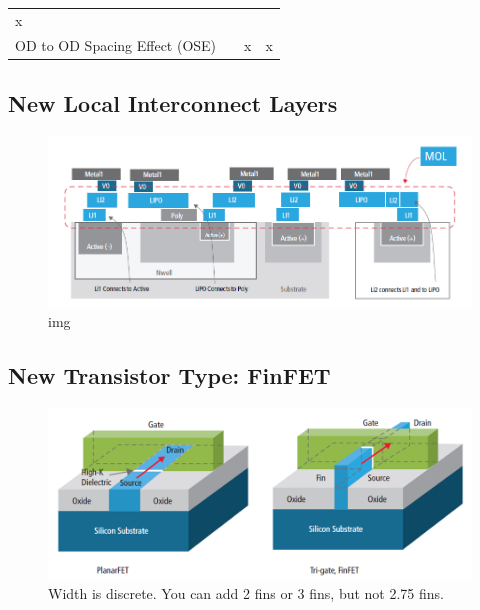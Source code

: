\documentclass[
]{article}
\begin{document}
\begin{longtable}[]{@{}lccc@{}}
\begin{minipage}[t]{0.14\columnwidth}
x\strut
\end{minipage}\tabularnewline
\begin{minipage}[t]{0.50\columnwidth}\raggedright
OD to OD Spacing Effect (OSE)\strut
\end{minipage} & \begin{minipage}[t]{0.12\columnwidth}\centering
\strut
\end{minipage} & \begin{minipage}[t]{0.12\columnwidth}\centering
x\strut
\end{minipage} & \begin{minipage}[t]{0.14\columnwidth}\centering
x\strut
\end{minipage}\tabularnewline
\bottomrule
\end{longtable}

\hypertarget{new-local-interconnect-layers}{%
\subsection{New Local Interconnect Layers}\label{new-local-interconnect-layers}}

\begin{figure}
\centering
\includegraphics{lec04.files/img003.png}
\caption{img}
\end{figure}

\hypertarget{new-transistor-type-finfet}{%
\subsection{New Transistor Type: FinFET}\label{new-transistor-type-finfet}}

\begin{figure}
\centering
\includegraphics{lec04.files/img004.png}
\caption{Width is discrete. You can add 2 fins or 3 fins, but not 2.75 fins.}
\end{figure}
\end{document}
